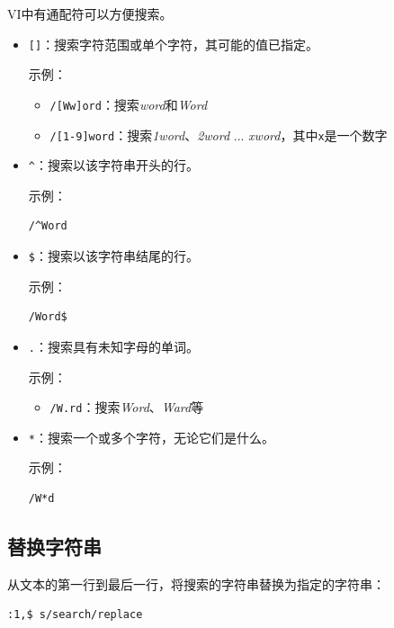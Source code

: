 \documentclass[12pt,a4paper,twoside]{ctexbook}
\begin{document}
VI中有通配符可以方便搜索。

\begin{itemize}
    \item \texttt{[]}：搜索字符范围或单个字符，其可能的值已指定。
    
    示例：
    \begin{itemize}
        \item \texttt{/[Ww]ord}：搜索\textit{word}和\textit{Word}
        \item \texttt{/[1-9]word}：搜索\textit{1word}、\textit{2word} ... \textit{xword}，其中\texttt{x}是一个数字
    \end{itemize}
    
    \item \texttt{\^{}}：搜索以该字符串开头的行。
    
    示例：
    \begin{verbatim}
/^Word
    \end{verbatim}
    
    \item \texttt{\$}：搜索以该字符串结尾的行。
    
    示例：
    \begin{verbatim}
/Word$
    \end{verbatim}
    
    \item \texttt{.}：搜索具有未知字母的单词。
    
    示例：
    \begin{itemize}
        \item \texttt{/W.rd}：搜索\textit{Word}、\textit{Ward}等
    \end{itemize}
    
    \item \texttt{*}：搜索一个或多个字符，无论它们是什么。
    
    示例：
    \begin{verbatim}
/W*d
    \end{verbatim}
\end{itemize}

\subsection{替换字符串}

从文本的第一行到最后一行，将搜索的字符串替换为指定的字符串：

\begin{verbatim}
:1,$ s/search/replace
\end{verbatim}
\end{document}
